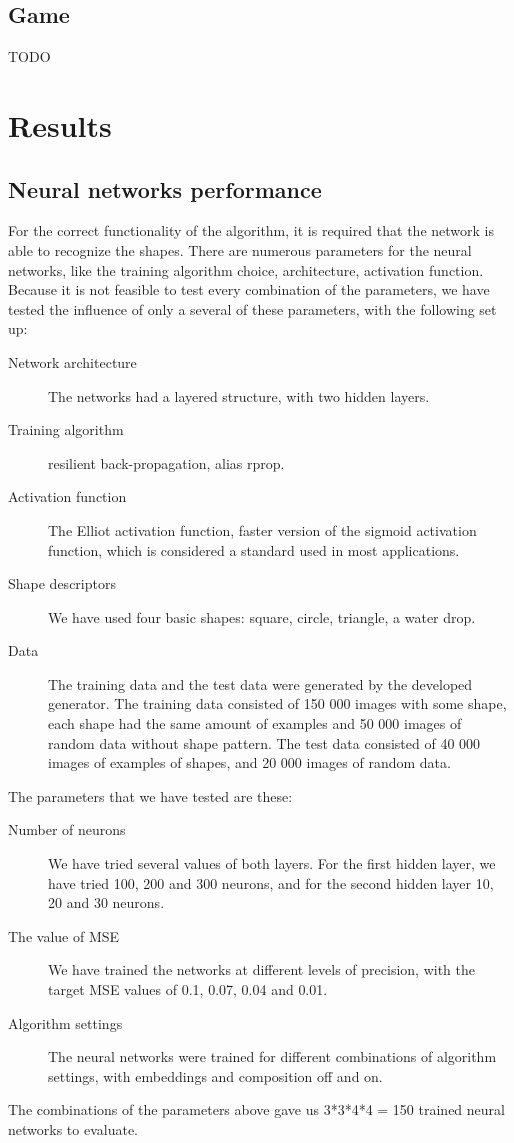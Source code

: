 \section{Game}
TODO

\chapter{Results}

\section{Neural networks performance}
For the correct functionality of the algorithm, it is required that the network is able to recognize the shapes. There are numerous parameters for the neural networks, like the training algorithm choice, architecture, activation function. Because it is not feasible to test every combination of the parameters, we have tested the influence of only a several of these parameters, with the following set up:
\begin{description}
\item [Network architecture] The networks had a layered structure, with two hidden layers.
\item [Training algorithm] resilient back-propagation, alias rprop.
\item [Activation function] The Elliot activation function, faster version of the sigmoid activation function, which is considered a standard used in most applications.
\item [Shape descriptors] We have used four basic shapes: square, circle, triangle, a water drop. 
\item [Data] The training data and the test data were generated by the developed generator. The training data consisted of 150 000 images with some shape, each shape had the same amount of examples and 50 000 images of random data without shape pattern. The test data consisted of 40 000 images of examples of shapes, and 20 000 images of random data.
\end{description}

The parameters that we have tested are these:
\begin{description}
\item [Number of neurons] We have tried several values of both layers. For the first hidden layer, we have tried 100, 200 and 300 neurons, and for the second hidden layer 10, 20 and 30 neurons. 
\item [The value of MSE] We have trained the networks at different levels of precision, with the target MSE values of 0.1, 0.07, 0.04 and 0.01.   
\item [Algorithm settings] The neural networks were trained for different combinations of algorithm settings, with embeddings and composition off and on.
\end{description}
The combinations of the parameters above gave us 3*3*4*4 = 150 trained neural networks to evaluate.

